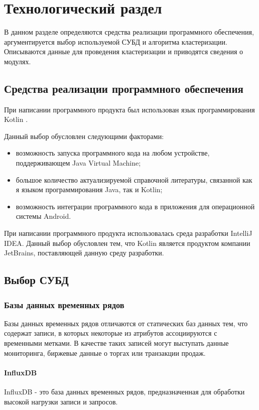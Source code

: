 \section{Технологический раздел}
В данном разделе определяются средства реализации программного обеспечения, аргументируется выбор используемой СУБД и алгоритма кластеризации. Описываются данные для проведения кластеризации и приводятся сведения о модулях.

\subsection{Средства реализации программного обеспечения}
При написании программного продукта был использован язык программирования Kotlin \cite{Kotlin}.

Данный выбор обусловлен следующими факторами:
\begin{itemize}[leftmargin=1.6\parindent]
	\item возможность запуска программного кода на любом устройстве, поддерживающем Java Virtual Machine;
	\item большое количество актуализируемой справочной литературы, связанной как я языком программирования Java, так и Kotlin;
	\item возможность интеграции программного кода в приложения для операционной системы Android.
\end{itemize}

При написании программного продукта использовалась среда разработки IntelliJ IDEA. Данный выбор обусловлен тем, что Kotlin является продуктом компании JetBrains, поставляющей данную среду разработки.

\subsection{Выбор СУБД}

\subsubsection{Базы данных временных рядов}
Базы данных временных рядов отличаются от статических баз данных тем, что содержат записи, в которых некоторые из атрибутов ассоциируются с временными метками. В качестве таких записей могут выступать данные мониторинга, биржевые данные о торгах или транзакции продаж. \cite{bdvrAnomalies}

\paragraph{InfluxDB}
InfluxDB - это база данных временных рядов, предназначенная для обработки высокой нагрузки записи и запросов.

